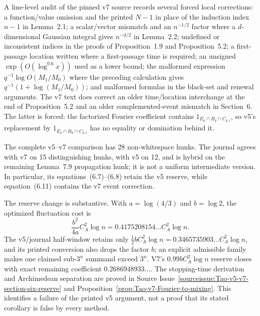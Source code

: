 \begin{sourceissue}
\label{sourceissue:Tao-v7-audit}
A line-level audit of the pinned v7 source records several forced local
corrections: a function/value omission and the printed $N-1$ in place of the
induction index $n-1$ in
Lemma~2.1; a scalar/vector mismatch and an $n^{-1/2}$ factor where a
$d$-dimensional Gaussian integral gives $n^{-d/2}$ in Lemma~2.2; undefined
or inconsistent indices in the proofs of Proposition~1.9 and
Proposition~5.2; a first-passage location written where a first-passage time
is required; an unsigned $\exp(O(\log^{0.6}x))$ used as a lower bound; the
malformed expression $q^{-1}\log O(M_1/M_0)$ where the preceding calculation
gives $q^{-1}(1+\log(M_1/M_0))$; and malformed formulas in the black-set and
renewal arguments.
The v7 text does correct an older time/location interchange at the end of
Proposition~5.2 and an older complemented-event mismatch in Section~6.
The latter is forced: the factorized Fourier coefficient contains
\(1_{E_k\cap B_k\cap C_{k,l}}\), so v5's replacement by
\(1_{\overline E_k\cap B_k\cap C_{k,l}}\) has no equality or domination
behind it.

The complete v5--v7 comparison has 28 non-whitespace hunks.  The journal
agrees with v7 on 15 distinguishing hunks, with v5 on 12, and is hybrid on
the remaining Lemma~7.9 propagation hunk; it is not a uniform intermediate
version.  In particular, its equations~(6.7)--(6.8) retain the v5 reserve,
while equation~(6.11) contains the v7 event correction.

The reserve change is substantive.  With
\(a=\log(4/3)\) and \(b=\log2\), the optimized fluctuation cost is
\[
 \frac{b^2}{4a}C_A^2\log n
 =0.4175208154\ldots C_A^2\log n.
\]
The v5/journal half-window retains only
\(\frac12bC_A^2\log n=0.3465735903\ldots C_A^2\log n\), and its printed
conversion also drops the factor \(b\); an explicit admissible family makes
one claimed sub-\(3^n\) summand exceed \(3^n\).  V7's
\(0.99bC_A^2\log n\) reserve closes with exact remaining coefficient
\(0.2686948933\ldots\).  The stopping-time derivation and Archimedean
separation are proved in
Source Issue~\ref{sourceissue:Tao-v5-v7-section-six-reserve} and
Proposition~\ref{prop:Tao-v7-Fourier-to-mixing}.  This identifies a failure
of the printed v5 argument, not a proof that its stated corollary is false
by every method.


\end{sourceissue}
